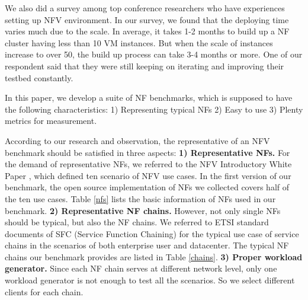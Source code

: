 We also did a survey among top conference researchers who have experiences setting up NFV environment. In our survey, we found that the deploying time varies much due to the scale. In average, it takes 1-2 months to build up a NF cluster having less than 10 VM instances. But when the scale of instances increase to over 50, the build up process can take 3-4 months or more. One of our respondent said that they were still keeping on iterating and improving their testbed constantly.



In this paper, we develop a suite of NF benchmarks, which is supposed to have the following characteristics: 1) Representing typical NFs 2) Easy to use 3) Plenty metrics for measurement.

According to our research and observation,
the representative of an NFV benchmark
should be satisfied in three aspects:
\textbf{1) Representative NFs.}
For the demand of representative NFs,
we referred to the NFV Introductory White Paper \cite{},
which defined ten scenario of NFV use cases.
In the first version of our benchmark,
the open source implementation of NFs we collected
covers half of the ten use cases.
Table \ref{nfs} lists the basic information of NFs used in our benchmark.
\textbf{2) Representative NF chains.}
However, not only single NFs should be typical, but also the NF chains.
We referred to ETSI standard documents of SFC
(Service Function Chaining) \cite{draft-ietf-sfc-dc-use-cases-06}
for the typical use case of service chains
in the scenarios of both enterprise user and datacenter.
The typical NF chains our benchmark provides are listed in Table \ref{chains}.
\textbf{3) Proper workload generator.}
Since each NF chain serves at different network level,
only one workload generator is not enough to test all the scenarios.
So we select different clients for each chain.


